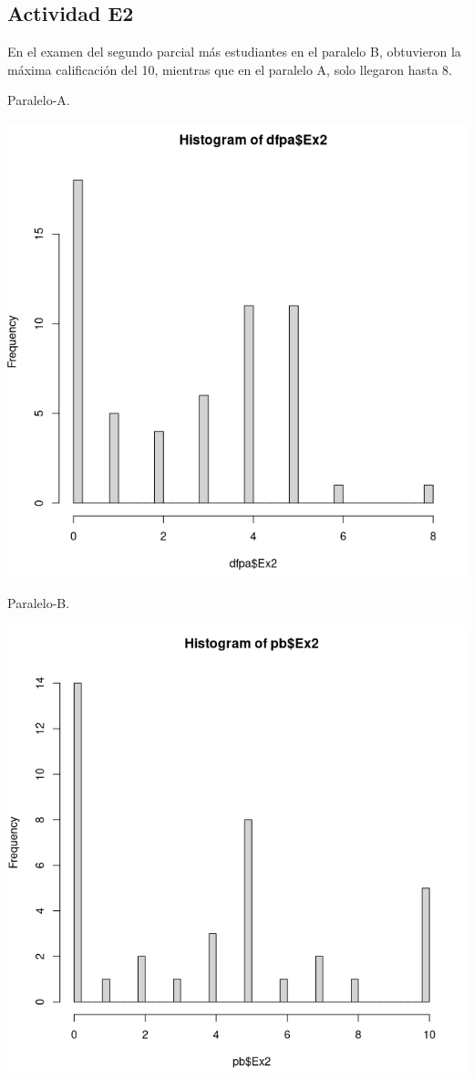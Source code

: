 \documentclass[a4pa<per,12pt,spanish]{article}
\begin{document}
\subsection{Actividad E2}
\label{sec:actividad-E2}
En el examen del segundo parcial más estudiantes en el paralelo B, obtuvieron la máxima calificación del 10, mientras que en el paralelo A, solo llegaron hasta 8.\\


\begin{minipage}[h]{0.45\linewidth}
Paralelo-A.

\includegraphics[scale=0.3]{images/histoEx2.png}
\end{minipage}
\begin{minipage}[h]{0.45\linewidth}
Paralelo-B.

\includegraphics[scale=0.3]{images/histo-PB-Ex2.png}
\end{minipage}
\end{document}
